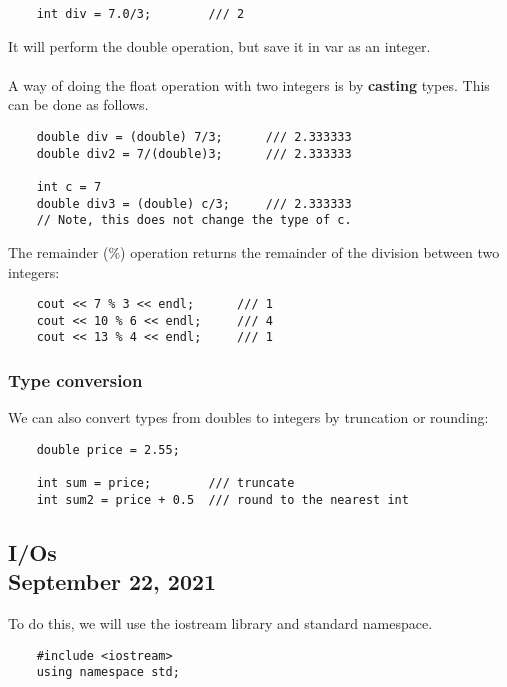 \documentclass[]{article}
\begin{document}
\begin{lstlisting}
	int div = 7.0/3;		/// 2
\end{lstlisting}
\bigbreak

It will perform the double operation, but save it in var as an integer. \\\\

A way of doing the float operation with two integers is by \textbf{casting} types. This can be done as follows.

\begin{lstlisting}
	double div = (double) 7/3;		/// 2.333333
	double div2 = 7/(double)3;		/// 2.333333
	
	int c = 7
	double div3 = (double) c/3;		/// 2.333333
	// Note, this does not change the type of c.
\end{lstlisting}
\bigbreak

The remainder (\%) operation returns the remainder of the division between two integers:

\begin{lstlisting}
	cout << 7 % 3 << endl;		/// 1
	cout << 10 % 6 << endl;		/// 4
	cout << 13 % 4 << endl;		/// 1
\end{lstlisting}

\subsubsection{Type conversion}

We can also convert types from doubles to integers by truncation or rounding: 

\begin{lstlisting}
	double price = 2.55;
	
	int sum = price;		/// truncate
	int sum2 = price + 0.5 	/// round to the nearest int
\end{lstlisting}


\subsection{I/Os\\ {\large \normalfont September 22, 2021}}
\bigbreak


To do this, we will use the iostream library and standard namespace.

\begin{lstlisting}
	#include <iostream>
	using namespace std;
\end{lstlisting}
\end{document}
